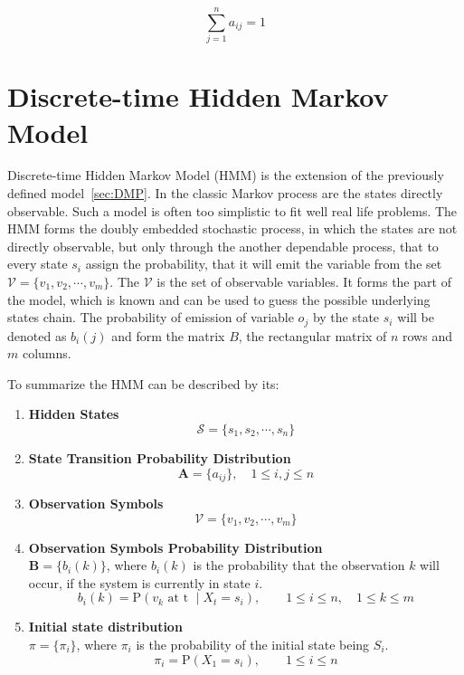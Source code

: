 \documentclass[thesis=M,english]{FITthesis}[2012/10/20]
\newcommand{\matr}[1]{\mathbf{#1}}
\begin{document}
\begin{equation}
   \sum_{j=1}^n a_{ij} = 1
\end{equation}

\section{Discrete-time Hidden Markov Model}

Discrete-time Hidden Markov Model (HMM) is the extension of the previously defined model~\ref{sec:DMP}. In the classic Markov process are the states directly observable. Such a model is often too simplistic to fit well real life problems. The HMM forms the doubly embedded stochastic process, in which the states are not directly observable, but only through the another dependable process, that to every state $s_i$ assign the probability, that it will emit the variable from the set $\mathcal{V}=\{  v_1,v_2,\cdots,v_m\}$. The $\mathcal{V}$ is the set of observable variables. It forms the part of the model, which is known and can be used to guess the possible underlying states chain. The probability of emission of variable $o_j$ by the state $s_i$ will be denoted as $b_i(j)$ and form the matrix $B$, the rectangular matrix of $n$ rows and $m$ columns.
  
To summarize the HMM can be described by its:

\begin{enumerate}[resume]
\setcounter{enumi}{0}
\item \textbf{Hidden States}
\begin{equation}
\mathcal{S} = \{ s_1,s_2, \cdots, s_n \}
\end{equation} 
\item \textbf{State Transition Probability Distribution}
\begin{equation}\label{eq:tp}
\matr{A} = \{ a_{ij} \}, \quad 1 \leq i,j \leq n
\end{equation} 
\item \textbf{Observation Symbols}
\begin{equation}
\mathcal{V} = \{ v_1,v_2, \cdots, v_m \} 
\end{equation}
\item \textbf{Observation Symbols Probability Distribution} \\
$\matr{B} = \{ b_{i}(k) \}$, where $b_{i}(k)$ is the probability that the observation $k$ will occur, if the system is currently in state $i$. 
\begin{equation}
b_i(k) = \mathrm{P}(v_k \text{ at t } \mid X_t = s_i), \qquad 1 \leq i \leq n, \quad 1 \leq k \leq m
\end{equation}
\item \textbf{Initial state distribution} \\
$\pi = \{ \pi_i \}$, where $\pi_i$ is the probability of the initial state being $S_i$.
\begin{equation}
\pi_{i} = \mathrm{P}(X_1 = s_i), \qquad 1 \leq i \leq n
\end{equation}
\end{enumerate}
\end{document}
